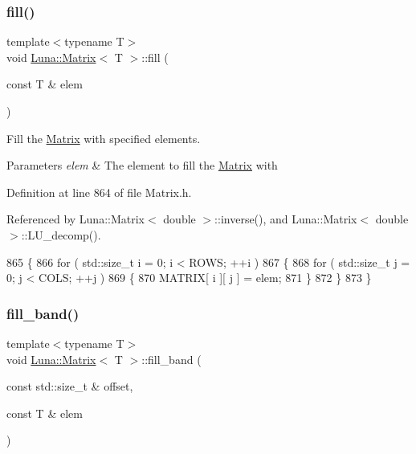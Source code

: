 \subsubsection{\texorpdfstring{fill()}{fill()}}
{\footnotesize\ttfamily template$<$typename T$>$ \\
void \hyperlink{classLuna_1_1Matrix}{Luna\+::\+Matrix}$<$ T $>$\+::fill (\begin{DoxyParamCaption}\item[{const T \&}]{elem }\end{DoxyParamCaption})\hspace{0.3cm}{\ttfamily [inline]}}



Fill the \hyperlink{classLuna_1_1Matrix}{Matrix} with specified elements. 


\begin{DoxyParams}{Parameters}
{\em elem} & The element to fill the \hyperlink{classLuna_1_1Matrix}{Matrix} with \\
\hline
\end{DoxyParams}


Definition at line 864 of file Matrix.\+h.



Referenced by Luna\+::\+Matrix$<$ double $>$\+::inverse(), and Luna\+::\+Matrix$<$ double $>$\+::\+L\+U\+\_\+decomp().


\begin{DoxyCode}
865   \{
866     \textcolor{keywordflow}{for} ( std::size\_t i = 0; i < ROWS; ++i )
867     \{
868       \textcolor{keywordflow}{for} ( std::size\_t j = 0; j < COLS; ++j )
869       \{
870         MATRIX[ i ][ j ] = elem;
871       \}
872     \}
873   \}
\end{DoxyCode}
\mbox{\label{classLuna_1_1Matrix_a157c952d5a8c60a61f5de8428e2deff0}} 
\subsubsection{\texorpdfstring{fill\+\_\+band()}{fill\_band()}}
{\footnotesize\ttfamily template$<$typename T$>$ \\
void \hyperlink{classLuna_1_1Matrix}{Luna\+::\+Matrix}$<$ T $>$\+::fill\+\_\+band (\begin{DoxyParamCaption}\item[{const std\+::size\+\_\+t \&}]{offset,  }\item[{const T \&}]{elem }\end{DoxyParamCaption})\hspace{0.3cm}{\ttfamily [inline]}}




